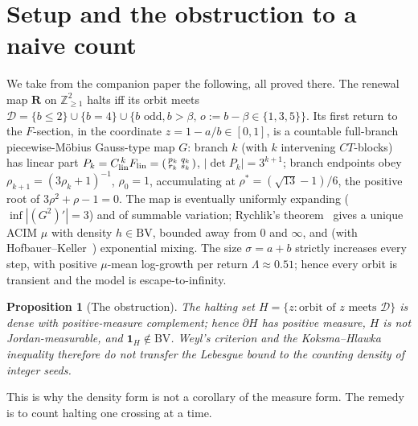 \documentclass[11pt]{article}
\newtheorem{proposition}{Proposition}\newtheorem{corollary}{Corollary}
\theoremstyle{definition}\newtheorem{definition}{Definition}
\theoremstyle{remark}\newtheorem{remark}{Remark}
\newcommand{\R}{\mathbf{R}}\newcommand{\Z}{\mathbb{Z}}\newcommand{\Leb}{\mathrm{Leb}}
\newcommand{\D}{\mathcal D}\newcommand{\Lop}{\mathcal L}\newcommand{\e}{\mathbf e}
\begin{document}
\section{Setup and the obstruction to a naive count}
We take from the companion paper the following, all proved there. The renewal
map $\R$ on $\Z_{\ge1}^2$ halts iff its orbit meets
$\D=\{b\le2\}\cup\{b=4\}\cup\{b\text{ odd},b>\beta,\,o:=b-\beta\in\{1,3,5\}\}$.
Its first return to the $F$-section, in the coordinate $z=1-a/b\in[0,1]$, is a
countable full-branch piecewise-M\"obius Gauss-type map $G$: branch $k$ (with
$k$ intervening $CT$-blocks) has linear part
$P_k=C_{\mathrm{lin}}^{\,k}F_{\mathrm{lin}}=\begin{psmallmatrix}p_k&q_k\\ r_k&s_k
\end{psmallmatrix}$, $|\det P_k|=3^{k+1}$; branch endpoints obey
$\rho_{k+1}=(3\rho_k+1)^{-1}$, $\rho_0=1$, accumulating at
$\rho^\ast=(\sqrt{13}-1)/6$, the positive root of $3\rho^2+\rho-1=0$. The map is
eventually uniformly expanding ($\inf|(G^2)'|=3$) and of summable variation;
Rychlik's theorem~\cite{Rychlik1983} gives a unique ACIM $\mu$ with density
$h\in\mathrm{BV}$, bounded away from $0$ and $\infty$, and (with
Hofbauer--Keller~\cite{HofbauerKeller1982}) exponential mixing. The size
$\sigma=a+b$ strictly increases every step, with positive $\mu$-mean log-growth
per return $\Lambda\approx0.51$; hence every orbit is transient and the model
is escape-to-infinity.

\begin{proposition}[The obstruction]\label{p:obstruction}
The halting set $H=\{z:\text{orbit of }z\text{ meets }\D\}$ is dense with
positive-measure complement; hence $\partial H$ has positive measure, $H$ is not
Jordan-measurable, and $\mathbf1_H\notin\mathrm{BV}$. Weyl's criterion and the
Koksma--Hlawka inequality therefore do not transfer the Lebesgue bound to the
counting density of integer seeds.
\end{proposition}
This is why the density form is not a corollary of the measure form. The remedy
is to count halting one crossing at a time.
\end{document}
